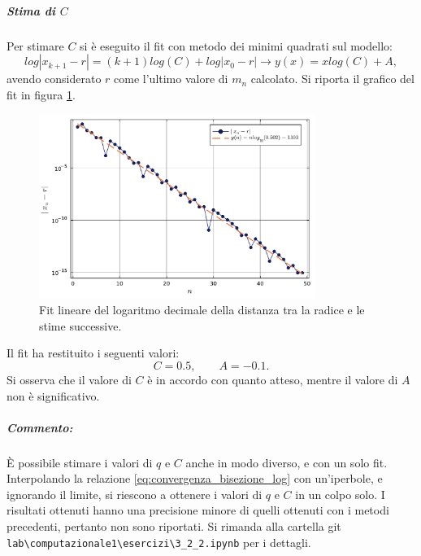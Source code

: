 \documentclass[letterpaper, 12pt]{article}
\begin{document}
\subparagraph{Stima di $C$}
Per stimare $C$ si è eseguito il fit con metodo dei minimi quadrati sul modello:
\begin{equation}
    log |x_{k+1}-r| = (k+1)log(C) + log|x_0 - r|   \rightarrow   y(x) = x log(C) + A ,
\end{equation}
avendo considerato $r$ come l'ultimo valore di $m_n$ calcolato. Si riporta il grafico del fit in figura \ref{fig:es3_2_2_3}.
\begin{figure}[!ht]
    \centering
    \includegraphics[width=0.8\textwidth]{3223.pdf}
    \caption{Fit lineare del logaritmo decimale della distanza tra la radice e le stime successive.}
    \label{fig:es3_2_2_3}
\end{figure}
Il fit ha restituito i seguenti valori:
\begin{equation}
    C = 0.5,
    \qquad
    A = -0.1.
\end{equation}
Si osserva che il valore di $C$ è in accordo con quanto atteso, mentre il valore di $A$ non è significativo.

\subparagraph{Commento: } È possibile stimare i valori di $q$ e $C$ anche in modo diverso, e con un solo fit.
Interpolando la relazione \ref{eq:convergenza_bisezione_log} con un'iperbole, e ignorando il limite, 
si riescono a ottenere i valori di $q$ e $C$ in un colpo solo. I risultati ottenuti hanno una precisione minore 
di quelli ottenuti  con i metodi precedenti, pertanto non sono riportati. Si rimanda alla cartella git
\verb|lab\computazionale1\esercizi\3_2_2.ipynb| per i dettagli.
\end{document}
